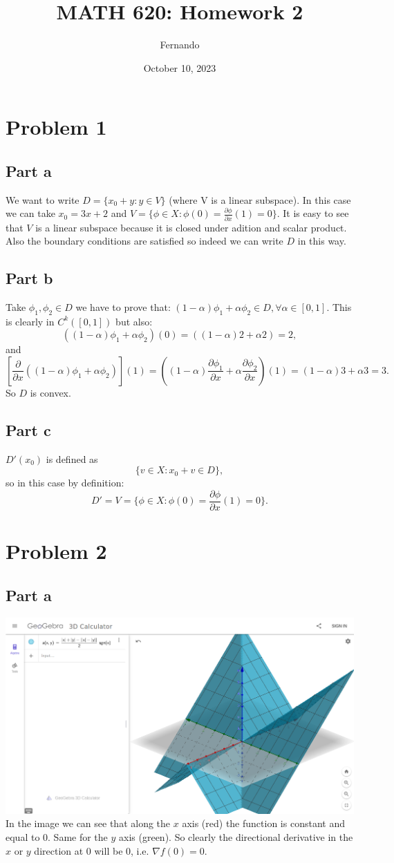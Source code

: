 \documentclass{article}
\title{MATH 620: Homework 2}
\author{Fernando}
\date{October 10, 2023}
\begin{document}
\maketitle
\section{Problem 1}
\subsection{Part a}
We want to write $D=\{x_0+y: y\in V\}$ (where V is a linear subspace).
In this case we can take $x_0=3x+2$ and $V=\{\phi\in X:
\phi(0)=\frac{\partial\phi}{\partial x}(1)=0\}$. It
is easy to see that $V$ is a linear subspace because it is closed under adition
and scalar product. Also the boundary conditions are satisfied so indeed we can
write $D$ in this way.
\subsection{Part b}
Take $\phi_1,\phi_2\in D$ we have to prove that:
$(1-\alpha)\phi_1+\alpha \phi_2 \in D,\forall \alpha \in [0,1]$.
This is clearly in $C^k([0,1])$ but also:
\[
\left((1-\alpha)\phi_1+\alpha\phi_2\right)(0)
=\left((1-\alpha)2+\alpha2\right)=2,
\]
and
\[
\left[\frac{\partial}{\partial x}\left((1-\alpha)\phi_1+\alpha \phi_2\right)\right](1)= 
\left((1-\alpha)\frac{\partial \phi_1}{\partial x}+\alpha\frac{\partial
\phi_2}{\partial x}\right)(1) = (1-\alpha)3+\alpha 3=3.
\]
So $D$ is convex.
\subsection{Part c}
$D'(x_0)$ is defined as
\[
	\{v\in X: x_0 +v \in D\},
\]
so in this case by definition:
\[
	D'=V=\{\phi\in X:
\phi(0)=\frac{\partial\phi}{\partial x}(1)=0\}.
\]
\section{Problem 2}
\subsection{Part a}
\includegraphics[width=\textwidth]{minsign.png}
In the image we can see that along the $x$ axis (red) the function is constant
and equal to 0. Same for the $y$ axis (green). So clearly the directional
derivative in the $x$ or $y$ direction at 0 will be 0, i.e. $\nabla f(0) =0$.
\end{document}
